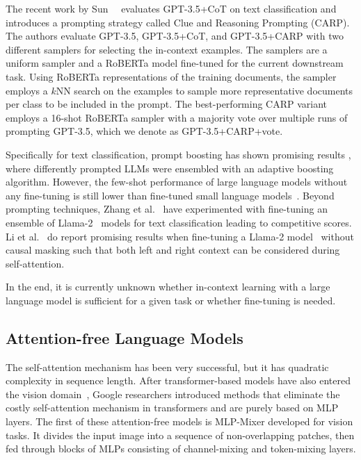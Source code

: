 The recent work by Sun~\etal~\cite{carp} evaluates GPT-3.5+CoT on text classification and introduces a prompting strategy called Clue and Reasoning Prompting (CARP).
The authors evaluate GPT-3.5, GPT-3.5+CoT, and GPT-3.5+CARP with two different samplers for selecting the in-context examples.
The samplers are a uniform sampler and a RoBERTa model fine-tuned for the current downstream task.
Using RoBERTa representations of the training documents, the sampler employs a $k$NN search on the examples to sample more representative documents per class to be included in the prompt.
The best-performing CARP variant employs a 16-shot RoBERTa sampler with a majority vote over multiple runs of prompting GPT-3.5, which we denote as GPT-3.5+CARP+vote.

Specifically for text classification, prompt boosting has shown promising results
\cite{pmlr-v202-hou23b}, where differently prompted LLMs were ensembled with an adaptive boosting algorithm. 
However, the few-shot performance of large language models without any fine-tuning is still lower than fine-tuned small language models~\cite{edwards2024language}.
Beyond prompting techniques,
Zhang et al.~\cite{DBLP:journals/corr/abs-2402-07470-pushing-the-limit} have experimented with fine-tuning an ensemble of Llama-2~\cite{touvronLlamaOpenFoundation2023} models for text classification leading to competitive scores.
Li et al.~\cite{li2023label} do report promising results when fine-tuning a Llama-2 model~\cite{touvronLlamaOpenFoundation2023} without causal masking such that both left and right context can be considered during self-attention. 

In the end, it is currently unknown whether in-context learning with a large language model is sufficient for a given task or whether fine-tuning is needed. 

\subsection{Attention-free Language Models}
The self-attention mechanism has been very successful, but it has quadratic complexity in sequence length.
After transformer-based models have also entered the vision domain~\cite{visiontransformer}, Google researchers introduced methods that eliminate the costly self-attention mechanism in transformers and are purely based on MLP layers. 
The first of these attention-free models is MLP-Mixer \cite{tolstikhin2021mlp} developed for vision tasks. 
It divides the input image into a sequence of non-overlapping patches, then fed through blocks of MLPs consisting of channel-mixing and token-mixing layers.

